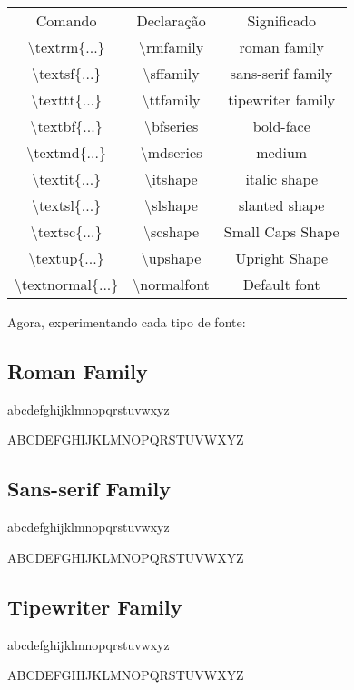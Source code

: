 \begin{center}
\begin{tabular}{ c c c }
Comando & Declaração & Significado \\
\textbackslash textrm\{...\}&\textbackslash rmfamily&roman family\\
\textbackslash textsf\{...\}&\textbackslash sffamily&sans-serif family\\
\textbackslash texttt\{...\}&\textbackslash ttfamily&tipewriter family\\
\textbackslash textbf\{...\}&\textbackslash bfseries&bold-face\\
\textbackslash textmd\{...\}&\textbackslash mdseries&medium\\
\textbackslash textit\{...\}&\textbackslash itshape&italic shape\\
\textbackslash textsl\{...\}&\textbackslash slshape&slanted shape\\
\textbackslash textsc\{...\}&\textbackslash scshape&Small Caps Shape\\
\textbackslash textup\{...\}&\textbackslash upshape&Upright Shape\\
\textbackslash textnormal\{...\} & \textbackslash normalfont & Default font\\
\end{tabular}
\end{center}

\vspace{10pt}

Agora, experimentando cada tipo de fonte:

\subsection{Roman Family}
\textrm{abcdefghijklmnopqrstuvwxyz}

\textrm{ABCDEFGHIJKLMNOPQRSTUVWXYZ}

\subsection{Sans-serif Family}
\textsf{abcdefghijklmnopqrstuvwxyz}

\textsf{ABCDEFGHIJKLMNOPQRSTUVWXYZ}

\subsection{Tipewriter Family}
\textrm{abcdefghijklmnopqrstuvwxyz}

\textrm{ABCDEFGHIJKLMNOPQRSTUVWXYZ}


